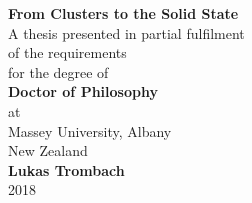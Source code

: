 
\begin{titlepage}
\begin{center}
\vspace*{10mm}
    \LARGE{\textbf{From Clusters to the Solid State
    }}\\\vspace{2cm}
    \large{
    A thesis presented in partial fulfilment \\ of the requirements \\ for the degree of 
    }\\\vspace{2cm}
    \large{\textbf{
    Doctor of Philosophy
    }}\\\vspace{2cm}
    \large{at \\ Massey University, Albany \\ New Zealand}\\\vspace{2cm}
    \large{\textbf{Lukas Trombach}}\\\vspace{1.5cm}
    \large{2018}
    
\end{center}
\end{titlepage}
